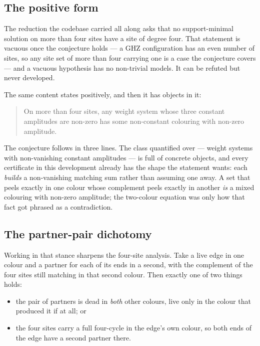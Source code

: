 \documentclass[11pt]{article}
\theoremstyle{definition}
\theoremstyle{remark}
\begin{document}
\subsection*{The positive form}

The reduction the codebase carried all along asks that no support-minimal solution on more
than four sites have a site of degree four. That statement is vacuous once the conjecture
holds --- a GHZ configuration has an even number of sites, so any site set of more than
four carrying one is a case the conjecture covers --- and a vacuous hypothesis has no
non-trivial models. It can be refuted but never developed.

The same content states positively, and then it has objects in it:

\begin{quote}
On more than four sites, any weight system whose three constant amplitudes are non-zero has
some non-constant colouring with non-zero amplitude.
\end{quote}

The conjecture follows in three lines. The class quantified over --- weight systems with
non-vanishing constant amplitudes --- is full of concrete objects, and every certificate in
this development already has the shape the statement wants: each \emph{builds} a
non-vanishing matching sum rather than assuming one away. A set that peels exactly in one
colour whose complement peels exactly in another \emph{is} a mixed colouring with non-zero
amplitude; the two-colour equation was only how that fact got phrased as a contradiction.

\subsection*{The partner-pair dichotomy}

Working in that stance sharpens the four-site analysis. Take a live edge in one colour and a
partner for each of its ends in a second, with the complement of the four sites still
matching in that second colour. Then exactly one of two things holds:

\begin{itemize}
\item the pair of partners is dead in \emph{both} other colours, live only in the colour that
produced it if at all; or
\item the four sites carry a full four-cycle in the edge's own colour, so both ends of the
edge have a second partner there.
\end{itemize}
\end{document}
